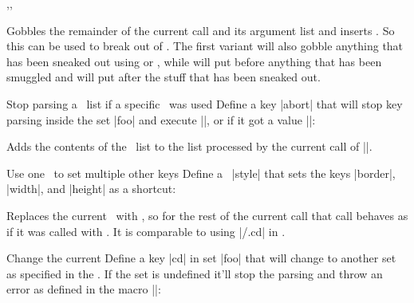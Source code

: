 \begin{function}{\ekvbreak,\ekvbreakPreSneak,\ekvbreakPostSneak}
  \begin{syntax}
  \end{syntax}
  Gobbles the remainder of the current  call and its argument list
  and inserts . So this can be used to break out of . The
  first variant will also gobble anything that has been sneaked out using
   or , while  will put
   before anything that has been smuggled and 
  will put  after the stuff that has been sneaked out.
\end{function}
\begin{example}{Stop parsing a \kv\ list if a specific \Nkey\ was used}
  Define a key |abort| that will stop key parsing inside the set |foo| and
  execute |\foo@aborted|, or if it got a value |\foo@aborted@with|:
  \begin{enverb}[no-tcb]
  \end{enverb}
\end{example}

\begin{function}{\ekvmorekv}
  \begin{syntax}
    \kvarg
  \end{syntax}
  Adds the contents of the \kv\ list to the list processed by the current call
  of |\ekvset|.
\end{function}
\begin{example}{Use one \key\ to set multiple other keys}
  Define a \Nkey\ |style| that sets the keys |border|, |width|, and |height| as
  a shortcut:
  \begin{enverb}[no-tcb]
  \end{enverb}
\end{example}

\begin{function}{\ekvchangeset}
  \begin{syntax}
  \end{syntax}
  Replaces the current \set\ with , so for the rest of the current
   call that call behaves as if it was called with
  . It is comparable to using \key|/.cd| in
  .
\end{function}
\begin{example}{Change the current \set}
  Define a key |cd| in set |foo| that will change to another set as specified in
  the \val. If the set is undefined it'll stop the parsing and throw an error as
  defined in the macro |\foo@cd@error|:
  \begin{enverb}[no-tcb]
      {}
  \end{enverb}
\end{example}

